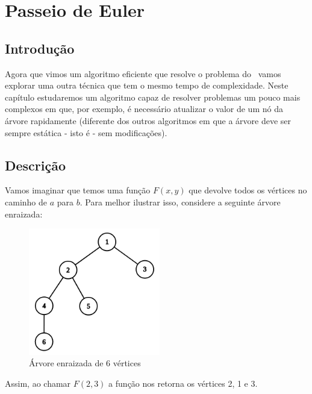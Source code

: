 \chapter{Passeio de Euler}
\label{cap:passeio-euler}

\section{Introdução}

Agora que vimos um algoritmo eficiente que resolve o problema do \LCA\, vamos explorar uma outra técnica que tem o mesmo tempo de complexidade. Neste capítulo estudaremos um algoritmo capaz de resolver problemas um pouco mais complexos em que, por exemplo, é necessário atualizar o valor de um nó da árvore rapidamente (diferente dos outros algoritmos em que a árvore deve ser sempre estática - isto é - sem modificações).


\section{Descrição}

Vamos imaginar que temos uma função $F(x, y)$ que devolve todos os vértices no caminho de $a$ para $b$. Para melhor ilustrar isso, considere a seguinte árvore enraizada:

\vspace{0.5cm}

\begin{figure}[htb]
\begin{center}
\includegraphics[width=5.75cm]{images/graph_euler.png}
\end{center}
\caption{\label{fig:arvore-euler}Árvore enraizada de 6 vértices}
\end{figure}

\vspace{0.5cm}

Assim, ao chamar $F(2, 3)$ a função nos retorna os vértices 2, 1 e 3.

